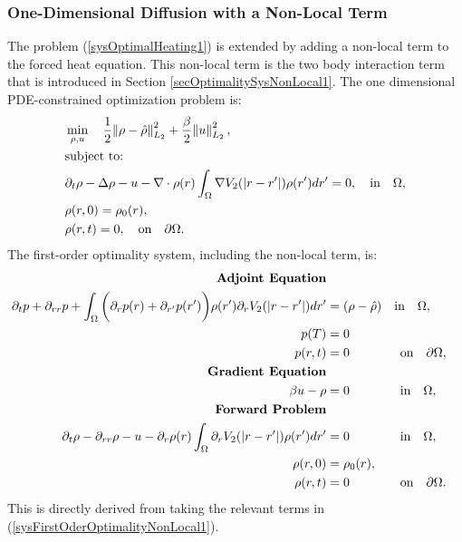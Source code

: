 \subsubsection*{One-Dimensional Diffusion with a Non-Local Term}\label{secOneDDiffusionNonlocalOptim1}
The problem (\ref{sysOptimalHeating1}) is extended by adding a non-local term to the forced heat equation. This non-local term is the two body interaction term that is introduced in Section \ref{secOptimalitySysNonLocal1}.
The one dimensional PDE-constrained optimization problem is:
\begin{align}
&\min_{\rho,u} \quad \frac{1}{2}\norm{\rho- \hat{\rho}}_{L_2}^2 + \frac{\beta}{2} \norm{u}_{L_2}^2,\\
&\text{subject to:}\notag 
\notag \\
&\partial_t \rho - \Delta \rho - u - \nabla \cdot \rho(r) \int_\Omega \nabla V_2(|r-r'|) \rho(r')dr'=0,  \quad \text{in} \quad \Omega,\notag 
\notag \\
&\rho(r,0)=\rho_0(r),\notag 
\notag \\
& \rho(r,t)=0, \quad \text{on} \quad \partial \Omega. \notag 
\end{align}
The first-order optimality system, including the non-local term, is:
\begin{align}\label{sysoptinonlocandheat1D}
\textbf{Adjoint Equation}  \\
\partial_t  p  + \partial_{rr} p + \int_\Omega \bigg(\partial_r  p(r)+\partial_{r'}  p(r')\bigg) \rho(r') \partial_r V_2(|r-r'|) dr' &=(\rho- \hat{\rho})  \quad \text{in} \quad \Omega, \notag \\
p(T) &= 0 \notag\\
p(r,t) &=0 \quad \quad \quad \quad \text{on}\quad \partial\Omega, \notag\\
\textbf{Gradient Equation} \notag \\
\beta u  - \rho  &=0 \quad\quad\quad\quad \text{in} \quad \Omega, \notag \\
\textbf{Forward Problem} \notag \\
\partial_t \rho - \partial_{rr} \rho-u - \partial_r  \rho(r) \int_\Omega \partial_r V_2(|r-r'|) \rho(r')dr' &=0 \quad\quad\quad\quad \text{in} \quad \Omega, \notag \\ 
\rho(r,0)&=\rho_0(r), \notag \\
\rho(r,t) &=0 \quad\quad\quad \quad \text{on} \quad \partial \Omega. \notag
\end{align}
This is directly derived from taking the relevant terms in (\ref{sysFirstOderOptimalityNonLocal1}).
